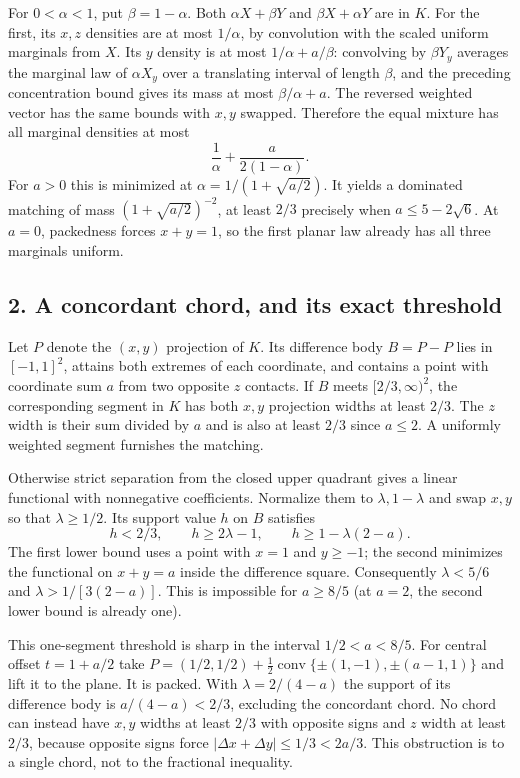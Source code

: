 \documentclass[
  10pt,
]{article}
\begin{document}
For \(0<\alpha<1\), put \(\beta=1-\alpha\). Both \(\alpha X+\beta Y\)
and \(\beta X+\alpha Y\) are in \(K\). For the first, its \(x,z\)
densities are at most \(1/\alpha\), by convolution with the scaled
uniform marginals from \(X\). Its \(y\) density is at most
\(1/\alpha+a/\beta\): convolving by \(\beta Y_y\) averages the marginal
law of \(\alpha X_y\) over a translating interval of length \(\beta\),
and the preceding concentration bound gives its mass at most
\(\beta/\alpha+a\). The reversed weighted vector has the same bounds
with \(x,y\) swapped. Therefore the equal mixture has all marginal
densities at most \[
 \frac1\alpha+\frac{a}{2(1-\alpha)}.
\] For \(a>0\) this is minimized at \(\alpha=1/(1+\sqrt{a/2})\). It
yields a dominated matching of mass \((1+\sqrt{a/2})^{-2}\), at least
\(2/3\) precisely when \(a\le5-2\sqrt6\). At \(a=0\), packedness forces
\(x+y=1\), so the first planar law already has all three marginals
uniform.

\subsection{2. A concordant chord, and its exact
threshold}\label{a-concordant-chord-and-its-exact-threshold}

Let \(P\) denote the \((x,y)\) projection of \(K\). Its difference body
\(B=P-P\) lies in \([-1,1]^2\), attains both extremes of each
coordinate, and contains a point with coordinate sum \(a\) from two
opposite \(z\) contacts. If \(B\) meets \([2/3,\infty)^2\), the
corresponding segment in \(K\) has both \(x,y\) projection widths at
least \(2/3\). The \(z\) width is their sum divided by \(a\) and is also
at least \(2/3\) since \(a\le2\). A uniformly weighted segment furnishes
the matching.

Otherwise strict separation from the closed upper quadrant gives a
linear functional with nonnegative coefficients. Normalize them to
\(\lambda,1-\lambda\) and swap \(x,y\) so that \(\lambda\ge1/2\). Its
support value \(h\) on \(B\) satisfies \[
 h<2/3,\qquad h\ge 2\lambda-1,\qquad h\ge 1-\lambda(2-a).
\] The first lower bound uses a point with \(x=1\) and \(y\ge-1\); the
second minimizes the functional on \(x+y=a\) inside the difference
square. Consequently \(\lambda<5/6\) and \(\lambda>1/[3(2-a)]\). This is
impossible for \(a\ge8/5\) (at \(a=2\), the second lower bound is
already one).

This one-segment threshold is sharp in the interval \(1/2<a<8/5\). For
central offset \(t=1+a/2\) take
\(P=(1/2,1/2)+\tfrac12\operatorname{conv}\{\pm(1,-1),\pm(a-1,1)\}\) and
lift it to the plane. It is packed. With \(\lambda=2/(4-a)\) the support
of its difference body is \(a/(4-a)<2/3\), excluding the concordant
chord. No chord can instead have \(x,y\) widths at least \(2/3\) with
opposite signs and \(z\) width at least \(2/3\), because opposite signs
force \(|\Delta x+\Delta y|\le1/3<2a/3\). This obstruction is to a
single chord, not to the fractional inequality.
\end{document}
